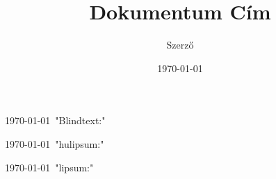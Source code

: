 \documentclass[11pt]{article}
\begin{document}
\title{Dokumentum Cím}
\author{Szerző}
\date{\today}
\maketitle
{}
\frenchspacing
\noindent
\today\
"Blindtext:"
\Blindtext[2]
\bigskip
\indent
\par
\raggedleft
{}
\today\
"hulipsum:"
\hulipsum[2-3]
\par
\raggedright
\linespread{2}
\today\
"lipsum:"
\lipsum[2-3]
\linespread{1}
\end{document}
